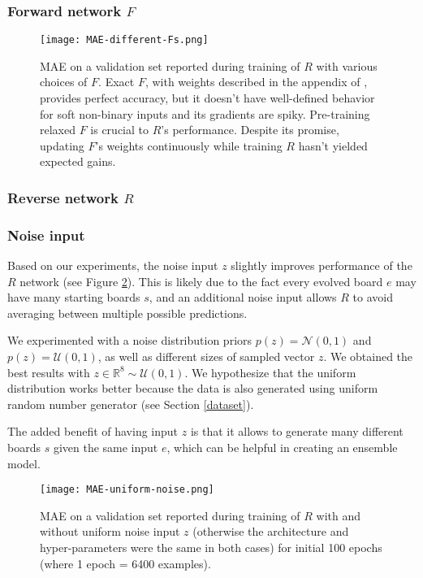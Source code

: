 \documentclass[conference]{IEEEtran}
\begin{document}
\subsubsection{Forward network $F$}

\begin{figure}
    \centering
    \texttt{[image: MAE-different-Fs.png]}
    \caption{MAE on a validation set reported during training of $R$ with various choices of $F$. Exact $F$, with weights described in the appendix of \cite{springer2020its}, provides perfect accuracy, but it doesn't have well-defined behavior for soft non-binary inputs and its gradients are spiky. Pre-training relaxed $F$ is crucial to $R$'s performance. Despite its promise, updating $F$'s weights continuously while training $R$ hasn't yielded expected gains.}
    \label{fig:my_label}
\end{figure}


\subsubsection{Reverse network $R$}

\subsubsection{Noise input}
Based on our experiments, the noise input $z$ slightly improves performance of the $R$ network (see Figure \ref{fig:noise}). This is likely due to the fact every evolved board $e$ may have many starting boards $s$, and an additional noise input allows $R$ to avoid averaging between multiple possible predictions.

We experimented with a noise distribution priors $p(z) = \mathcal{N}(0,1)$ and $p(z) = \mathcal{U}(0,1)$, as well as different sizes of sampled vector $z$. We obtained the best results with $z \in \mathbb{R}^8 \sim \mathcal{U}(0,1)$. We hypothesize that the uniform distribution works better because the data is also generated using uniform random number generator (see Section \ref{dataset}).

The added benefit of having input $z$ is that it allows to generate many different boards $s$ given the same input $e$, which can be helpful in creating an ensemble model.

\begin{figure}[!h]
    \centering
    \texttt{[image: MAE-uniform-noise.png]}
    \caption{MAE on a validation set reported during training of $R$ with and without uniform noise input $z$ (otherwise the architecture and hyper-parameters were the same in both cases) for initial 100 epochs (where 1 epoch = 6400 examples).}
    \label{fig:noise}
\end{figure}
\end{document}

